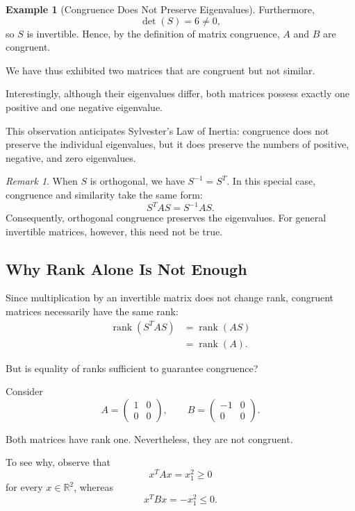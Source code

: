 \documentclass[11pt]{article}
\theoremstyle{definition}
\newtheorem{example}[theorem]{Example}
\theoremstyle{remark}
\newtheorem{remark}[theorem]{Remark}
\begin{document}
\begin{example}[Congruence Does Not Preserve Eigenvalues]
Furthermore,
\[
    \det(S)=6\neq 0,
\]
so $S$ is invertible. Hence, by the definition
of matrix congruence, $A$ and $B$ are congruent.

We have thus exhibited two matrices that are
congruent but not similar.

Interestingly, although their eigenvalues
differ, both matrices possess exactly one
positive and one negative eigenvalue.

This observation anticipates Sylvester's
Law of Inertia: congruence does not preserve
the individual eigenvalues, but it does
preserve the numbers of positive, negative,
and zero eigenvalues.
\end{example}



\begin{remark}
When $S$ is orthogonal, we have $S^{-1}=S^T$.
In this special case, congruence and similarity
take the same form:
\[
    S^TAS=S^{-1}AS.
\]
Consequently, orthogonal congruence preserves
the eigenvalues. For general invertible matrices,
however, this need not be true.
\end{remark}

\subsection{Why Rank Alone Is Not Enough}

Since multiplication by an invertible matrix
does not change rank, congruent matrices
necessarily have the same rank:
\[
\begin{aligned}
    \operatorname{rank}(S^TAS)
    &=\operatorname{rank}(AS)\\
    &=\operatorname{rank}(A).
\end{aligned}
\]

But is equality of ranks sufficient to
guarantee congruence?

Consider
\[
    A=
    \begin{pmatrix}
        1&0\\
        0&0
    \end{pmatrix},
    \qquad
    B=
    \begin{pmatrix}
        -1&0\\
        0&0
    \end{pmatrix}.
\]

Both matrices have rank one. Nevertheless,
they are not congruent.

To see why, observe that
\[
    x^TAx=x_1^2\geq 0
\]
for every $x\in\mathbb{R}^2$, whereas
\[
    x^TBx=-x_1^2\leq 0.
\]
\end{document}
